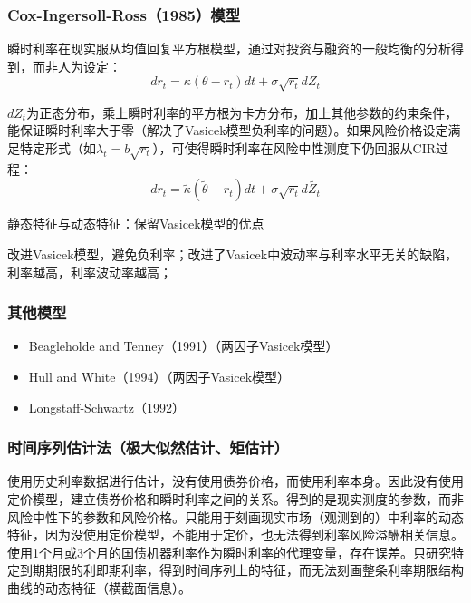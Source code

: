 \documentclass[11pt]{article}
\begin{document}
\subsubsection{Cox-Ingersoll-Ross（1985）模型}

瞬时利率在现实服从均值回复平方根模型，通过对投资与融资的一般均衡的分析得到，而非人为设定：
\begin{equation*}
	dr_t = \kappa(\theta-r_t)dt+\sigma\sqrt{r_t} dZ_t
\end{equation*}

$dZ_t$为正态分布，乘上瞬时利率的平方根为卡方分布，加上其他参数的约束条件，能保证瞬时利率大于零（解决了Vasicek模型负利率的问题）。如果风险价格设定满足特定形式（如$\lambda_t=b\sqrt{r_t}$），可使得瞬时利率在风险中性测度下仍回服从CIR过程：
\begin{equation*}
	dr_t = \tilde{\kappa}(\tilde{\theta}-r_t)dt+\sigma\sqrt{r_t} d\tilde{Z_t}
\end{equation*}

静态特征与动态特征：保留Vasicek模型的优点

改进Vasicek模型，避免负利率；改进了Vasicek中波动率与利率水平无关的缺陷，利率越高，利率波动率越高；

\subsubsection{其他模型}

\begin{itemize}
    \item Beagleholde and Tenney（1991）（两因子Vasicek模型）
    \item Hull and White（1994）（两因子Vasicek模型）
    \item Longstaff-Schwartz（1992）
\end{itemize}

\subsubsection{时间序列估计法（极大似然估计、矩估计）}

使用历史利率数据进行估计，没有使用债券价格，而使用利率本身。因此没有使用定价模型，建立债券价格和瞬时利率之间的关系。得到的是现实测度的参数，而非风险中性下的参数和风险价格。只能用于刻画现实市场（观测到的）中利率的动态特征，因为没使用定价模型，不能用于定价，也无法得到利率风险溢酬相关信息。使用1个月或3个月的国债机器利率作为瞬时利率的代理变量，存在误差。只研究特定到期期限的利即期利率，得到时间序列上的特征，而无法刻画整条利率期限结构曲线的动态特征（横截面信息）。
\end{document}
